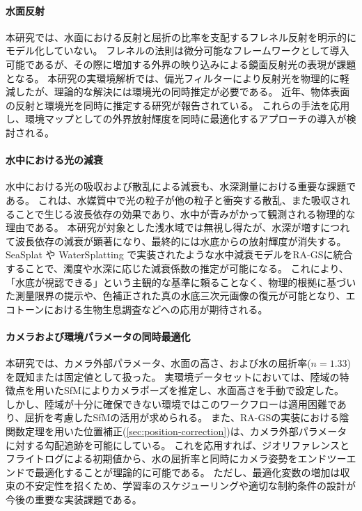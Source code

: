 \paragraph{水面反射}\label{subsec:surface-reflection}


本研究では、水面における反射と屈折の比率を支配するフレネル反射を明示的にモデル化していない。
フレネルの法則は微分可能なフレームワークとして導入可能であるが、その際に増加する外界の映り込みによる鏡面反射光の表現が課題となる。
本研究の実環境解析では、偏光フィルターにより反射光を物理的に軽減したが、理論的な解決には環境光の同時推定が必要である。
近年、物体表面の反射と環境光を同時に推定する研究\cite{Jiang2024CVPR_GaussianShader,Ye2024SIGGRAPH_DeferredReflection}が報告されている。
これらの手法を応用し、環境マップとしての外界放射輝度を同時に最適化するアプローチの導入が検討される。

\paragraph{水中における光の減衰}\label{subsec:light-attenuation}


水中における光の吸収および散乱による減衰も、水深測量における重要な課題である。
これは、水媒質中で光の粒子が他の粒子と衝突する散乱、また吸収されることで生じる波長依存の効果であり、水中が青みがかって観測される物理的な理由である。
本研究が対象とした浅水域では無視し得たが、水深が増すにつれて波長依存の減衰が顕著になり、最終的には水底からの放射輝度が消失する。
SeaSplat \cite{Yang2025ICRA_SeaSplat} や WaterSplatting \cite{li20243DV_watersplatting} で実装されたような水中減衰モデルをRA-GSに統合することで、濁度や水深に応じた減衰係数の推定が可能になる。
これにより、「水底が視認できる」という主観的な基準に頼ることなく、物理的根拠に基づいた測量限界の提示や、色補正された真の水底三次元画像の復元が可能となり、エコトーンにおける生物生息調査などへの応用が期待される。

\paragraph{カメラおよび環境パラメータの同時最適化}\label{subsec:camera-and-environment-parameter-optimization}


本研究では、カメラ外部パラメータ、水面の高さ、および水の屈折率($n=1.33$)を既知または固定値として扱った。
実環境データセットにおいては、陸域の特徴点を用いたSfMによりカメラポーズを推定し、水面高さを手動で設定した。
しかし、陸域が十分に確保できない環境ではこのワークフローは適用困難であり、屈折を考慮したSfM\cite{Makris2024_refractive-aware-sfm}の活用が求められる。
また、RA-GSの実装における陰関数定理を用いた位置補正(\cref{sec:position-correction})は、カメラ外部パラメータに対する勾配追跡を可能にしている。
これを応用すれば、ジオリファレンスとフライトログによる初期値から、水の屈折率と同時にカメラ姿勢をエンドツーエンドで最適化することが理論的に可能である。
ただし、最適化変数の増加は収束の不安定性を招くため、学習率のスケジューリングや適切な制約条件の設計が今後の重要な実装課題である。

